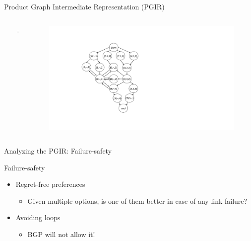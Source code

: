 \begin{frame}{Product Graph Intermediate Representation (PGIR)}
\begin{columns}
\begin{column}{0.35\textwidth}
{
            }
        \end{column}
        \begin{column}{0.01\textwidth}
             $\Rightarrow$
        \end{column}
        \begin{column}{0.45\textwidth}
            \begin{figure}[htb]
                \includegraphics[height=\textheight,keepaspectratio,clip,trim={5cm 0cm 16cm 2cm}]{figures/pgir.pdf}
            \end{figure}
        \end{column}
    \end{columns}
\end{frame}

\begin{frame}{Analyzing the PGIR: Failure-safety}
    \begin{block}{Failure-safety}
        \begin{itemize}
            \item Regret-free preferences
            \begin{itemize}
                \item Given multiple options, is one of them better in case of any link failure?
            \end{itemize}
            \item Avoiding loops
            \begin{itemize}
                \item BGP will not allow it!
            \end{itemize}
        \end{itemize}
    \end{block}
\end{frame}

